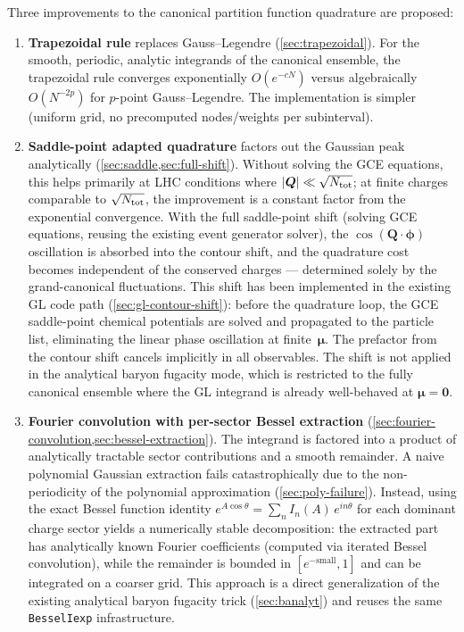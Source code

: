 \documentclass[11pt,a4paper]{article}
\newcommand{\bphi}{\bm{\phi}}
\newcommand{\bQ}{\bm{Q}}
\begin{document}
Three improvements to the canonical partition function quadrature are proposed:

\begin{enumerate}
  \item \textbf{Trapezoidal rule} replaces Gauss--Legendre (\cref{sec:trapezoidal}).
  For the smooth, periodic, analytic integrands of the canonical ensemble, the trapezoidal rule converges exponentially $O(e^{-cN})$ versus algebraically $O(N^{-2p})$ for $p$-point Gauss--Legendre.
  The implementation is simpler (uniform grid, no precomputed nodes/weights per subinterval).

  \item \textbf{Saddle-point adapted quadrature} factors out the Gaussian peak analytically (\cref{sec:saddle,sec:full-shift}).
  Without solving the GCE equations, this helps primarily at LHC conditions where $|\bQ| \ll \sqrt{N_{\rm tot}}$; at finite charges comparable to $\sqrt{N_{\rm tot}}$, the improvement is a constant factor from the exponential convergence.
  With the full saddle-point shift (solving GCE equations, reusing the existing event generator solver), the $\cos(\bQ \cdot \bphi)$ oscillation is absorbed into the contour shift, and the quadrature cost becomes independent of the conserved charges --- determined solely by the grand-canonical fluctuations.
  This shift has been implemented in the existing GL code path (\cref{sec:gl-contour-shift}): before the quadrature loop, the GCE saddle-point chemical potentials are solved and propagated to the particle list, eliminating the linear phase oscillation at finite~$\bm{\mu}$.
  The prefactor from the contour shift cancels implicitly in all observables.
  The shift is not applied in the analytical baryon fugacity mode, which is restricted to the fully canonical ensemble where the GL integrand is already well-behaved at $\bm{\mu} = \bm{0}$.

  \item \textbf{Fourier convolution with per-sector Bessel extraction} (\cref{sec:fourier-convolution,sec:bessel-extraction}).
  The integrand is factored into a product of analytically tractable sector contributions and a smooth remainder.
  A naive polynomial Gaussian extraction fails catastrophically due to the non-periodicity of the polynomial approximation (\cref{sec:poly-failure}).
  Instead, using the exact Bessel function identity $e^{A\cos\theta} = \sum_n I_n(A)\,e^{in\theta}$ for each dominant charge sector yields a numerically stable decomposition: the extracted part has analytically known Fourier coefficients (computed via iterated Bessel convolution), while the remainder is bounded in $[e^{-\text{small}}, 1]$ and can be integrated on a coarser grid.
  This approach is a direct generalization of the existing analytical baryon fugacity trick (\cref{sec:banalyt}) and reuses the same \texttt{BesselIexp} infrastructure.
\end{enumerate}
\end{document}
